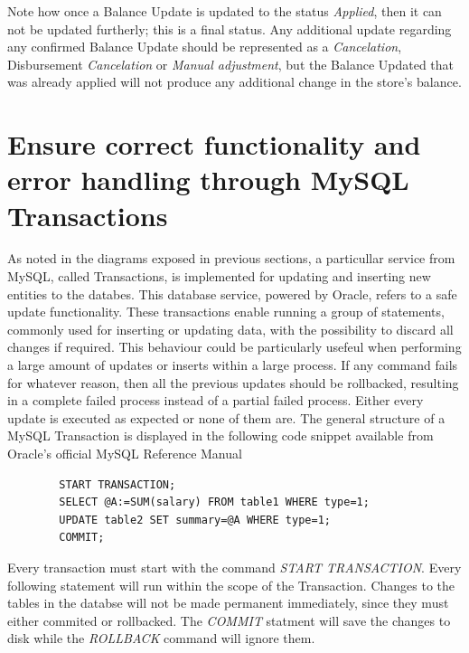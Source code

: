 Note how once a Balance Update is updated to the status \textit{Applied}, then it can not be updated furtherly; this is a final status. Any additional update regarding any confirmed Balance Update should be represented as a \textit{Cancelation}, Disbursement \textit{Cancelation} or \textit{Manual adjustment}, but the Balance Updated that was already applied will not produce any additional change in the store's balance.


\section{Ensure correct functionality and error handling through MySQL Transactions}

As noted in the diagrams exposed in previous sections, a particullar service from MySQL, called Transactions, is implemented for updating and inserting new entities to the databes. This database service, powered by Oracle, refers to a safe update functionality. These transactions enable running a group of statements, commonly used for inserting or updating data, with the possibility to discard all changes if required. This behaviour could be particularly usefeul when performing a large amount of updates or inserts within a large process. If any command fails for whatever reason, then all the previous updates should be rollbacked, resulting in a complete failed process instead of a partial failed process. Either every update is executed as expected or none of them are. The general structure of a MySQL Transaction is displayed in the following code snippet available from Oracle's official MySQL Reference Manual \cite{mysqldocs}

\begin{center}
    \begin{verbatim}
        START TRANSACTION;
        SELECT @A:=SUM(salary) FROM table1 WHERE type=1;
        UPDATE table2 SET summary=@A WHERE type=1;
        COMMIT;
    \end{verbatim}
\end{center}

Every transaction must start with the command \textit{START TRANSACTION}. Every following statement will run within the scope of the Transaction. Changes to the tables in the databse will not be made permanent immediately, since they must either commited or rollbacked. The \textit{COMMIT} statment will save the changes to disk while the \textit{ROLLBACK} command will ignore them. \cite{mysqldocs}\\

